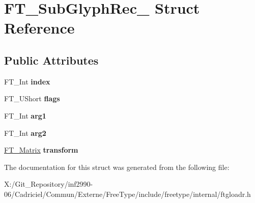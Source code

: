 \hypertarget{struct_f_t___sub_glyph_rec__}{\section{F\-T\-\_\-\-Sub\-Glyph\-Rec\-\_\- Struct Reference}
\label{struct_f_t___sub_glyph_rec__}
}
\subsection*{Public Attributes}
\begin{DoxyCompactItemize}
\item 
\hypertarget{struct_f_t___sub_glyph_rec___aa4febc2d867ff074ac116b068f372d3a}{F\-T\-\_\-\-Int {\bfseries index}}\label{struct_f_t___sub_glyph_rec___aa4febc2d867ff074ac116b068f372d3a}

\item 
\hypertarget{struct_f_t___sub_glyph_rec___a2d02aefc16061f7e039f76074518f6e5}{F\-T\-\_\-\-U\-Short {\bfseries flags}}\label{struct_f_t___sub_glyph_rec___a2d02aefc16061f7e039f76074518f6e5}

\item 
\hypertarget{struct_f_t___sub_glyph_rec___ad9f6b04ef50e1b39db90331e76f38206}{F\-T\-\_\-\-Int {\bfseries arg1}}\label{struct_f_t___sub_glyph_rec___ad9f6b04ef50e1b39db90331e76f38206}

\item 
\hypertarget{struct_f_t___sub_glyph_rec___a0d27a8b473379cedeb061f9ecd7e97da}{F\-T\-\_\-\-Int {\bfseries arg2}}\label{struct_f_t___sub_glyph_rec___a0d27a8b473379cedeb061f9ecd7e97da}

\item 
\hypertarget{struct_f_t___sub_glyph_rec___a3c5fc1959a357c6c2b970ec2118d2683}{\hyperlink{struct_f_t___matrix__}{F\-T\-\_\-\-Matrix} {\bfseries transform}}\label{struct_f_t___sub_glyph_rec___a3c5fc1959a357c6c2b970ec2118d2683}

\end{DoxyCompactItemize}


The documentation for this struct was generated from the following file\-:\begin{DoxyCompactItemize}
\item 
X\-:/\-Git\-\_\-\-Repository/inf2990-\/06/\-Cadriciel/\-Commun/\-Externe/\-Free\-Type/include/freetype/internal/ftgloadr.\-h\end{DoxyCompactItemize}
